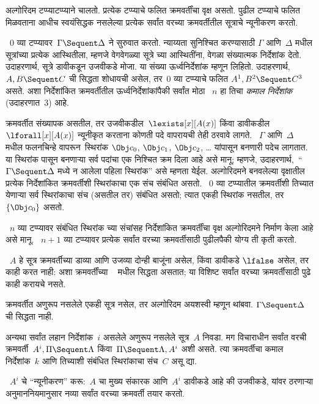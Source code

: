 अल्गोरिदम टप्प्याटप्प्याने चालतो.
प्रत्येक टप्प्याचे फलित क्रमवर्तींचा वृक्ष असतो.
पुढील टप्प्याचे फलित मिळवताना आधीच स्वयंसिद्धक
नसलेल्या प्रत्येक सर्वांत वरच्या क्रमवर्तीतील
सूत्राचे न्यूनीकरण करतो.

~$0$ व्या टप्प्यावर~$\Gamma \Sequent \Delta$
ने सुरुवात करतो. न्याय्यता सुनिश्चित करण्यासाठी
$\Gamma$ आणि~$\Delta$ मधील सूत्रांच्या
प्रत्येक आस्थितीला, म्हणजे वेगवेगळ्या सूत्रे
च्या आस्थितींना, वेगळा संख्यात्मक निर्देशांक
देतो. उदाहरणार्थ, सूत्रे डावीकडून उजवीकडे
मोजा. या संख्या ऊर्ध्वनिर्देशांक म्हणून लिहितो.
उदाहरणार्थ,~$A, B \Sequent C$ ची सिद्धता
शोधायची असेल, तर~$0$ व्या टप्प्याचे फलित
$A^1, B^2 \Sequent C^3$ असते. अशा निर्देशांकित
क्रमवर्तीतील ऊर्ध्वनिर्देशांकांपैकी सर्वांत मोठा
~$n$ हा तिचा \emph{कमाल निर्देशांक}
(उदाहरणात~$3$) आहे.

क्रमवर्तीत संख्यापक असतील, तर
उजवीकडील~$\lexists[x][A(x)]$ किंवा डावीकडील
$\lforall[x][A(x)]$ न्यूनीकृत करताना कोणती पदे
वापरायची तेही ठरवावे लागते. ~$\Gamma$ आणि~$\Delta$
मधील फलनचिन्हे वापरून~स्थिरांक
$\Obj c_0$, $\Obj c_1$, $\Obj c_2$, \dots
यांपासून बनणारी पदेच लागतात. या स्थिरांक
पासून बनणाऱ्या सर्व पदांचा
एक निश्चित क्रम दिला आहे असे मानू; म्हणजे,
उदाहरणार्थ,~``$\Gamma \Sequent \Delta$ मध्ये
न आलेला पहिला स्थिरांक'' असे म्हणता येईल.
अल्गोरिदमने बनवलेल्या वृक्षातील प्रत्येक
निर्देशांकित क्रमवर्तीशी स्थिरांकाचा एक संच
संबंधित असतो. ~$0$ व्या टप्प्यातील क्रमवर्तीशी
तिच्यात येणाऱ्या सर्व स्थिरांकाचा संच
(असतील तर) संबंधित असतो; त्यात एकही
स्थिरांक नसतील, तर~$\{\Obj c_0\}$ असतो.

~$n$ व्या टप्प्यावर संबंधित स्थिरांक
च्या संचांसह निर्देशांकित क्रमवर्तींचा वृक्ष
अल्गोरिदमने निर्माण केला आहे असे मानू.
~$n+1$ व्या टप्प्यावर प्रत्येक सर्वांत वरच्या
क्रमवर्तीसाठी पुढीलपैकी योग्य ती कृती करतो.

~$A$ हे सूत्र क्रमवर्तीच्या डाव्या
आणि उजव्या दोन्ही बाजूंना असेल, किंवा डावीकडे
$\lfalse$ असेल, तर काही करत नाही: अशा क्रमवर्तींच्या
~ मधील सिद्धता असतात; या विशिष्ट
सर्वांत वरच्या क्रमवर्तीसाठी पुढे काही करायचे नसते.

क्रमवर्तीत अणुरूप नसलेले एकही सूत्र
नसेल, तर अल्गोरिदम अयशस्वी म्हणून थांबवा.
$\Gamma \Sequent \Delta$ ची सिद्धता नाही.

अन्यथा सर्वांत लहान निर्देशांक~$i$ असलेले
अणुरूप नसलेले सूत्र~$A$ निवडा. मग विचाराधीन
सर्वांत वरची क्रमवर्ती~$A^i, \Pi \Sequent \Lambda$
किंवा~$\Pi \Sequent \Lambda, A^i$ अशी असते.
त्या क्रमवर्तीचा कमाल निर्देशांक~$k$ आणि
तिच्याशी संबंधित स्थिरांकाचा संच~$C$ असू द्या.

~$A^i$ चे ``न्यूनीकरण'' करू:~$A$
चा मुख्य संकारक आणि~$A^i$ डावीकडे आहे
की उजवीकडे, यांवर ठरणाऱ्या अनुमाननियमानुसार
नव्या सर्वांत वरच्या क्रमवर्ती तयार करतो.

